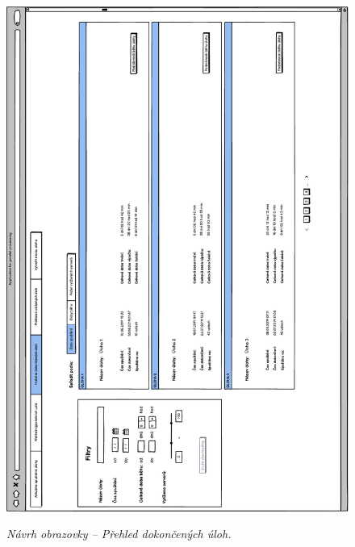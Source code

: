 \begin{figure}[H]
\begin{center}
    \scalebox{0.78}
    {   
        \includegraphics{images/wireframe_appendix_historyTaskOverview.pdf}
    }
    \caption{\label{obr:wireframe_appendix_historyTaskOverview} {\it Návrh obrazovky -- Přehled dokončených úloh.}}
\end{center}
\end{figure}


